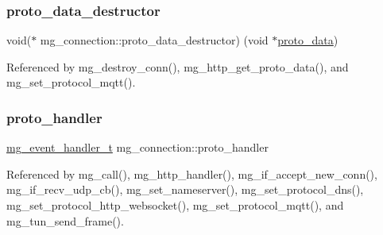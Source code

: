 \mbox{\label{structmg__connection_a834e7757b28379b2ca0b8b6c51d7ba95_a834e7757b28379b2ca0b8b6c51d7ba95}} 
\subsubsection{\texorpdfstring{proto\+\_\+data\+\_\+destructor}{proto\_data\_destructor}}
{\footnotesize\ttfamily void($\ast$ mg\+\_\+connection\+::proto\+\_\+data\+\_\+destructor) (void $\ast$\hyperlink{structmg__connection_a7508851a3c070a1357c226781fa92bb7_a7508851a3c070a1357c226781fa92bb7}{proto\+\_\+data})}



Referenced by mg\+\_\+destroy\+\_\+conn(), mg\+\_\+http\+\_\+get\+\_\+proto\+\_\+data(), and mg\+\_\+set\+\_\+protocol\+\_\+mqtt().

\mbox{\label{structmg__connection_ae6b1f0d002253c0f80371fc5a7bbfc70_ae6b1f0d002253c0f80371fc5a7bbfc70}} 
\subsubsection{\texorpdfstring{proto\+\_\+handler}{proto\_handler}}
{\footnotesize\ttfamily \hyperlink{mongoose_8h_ae5a76da37b3496fcdf561e51648eabda_ae5a76da37b3496fcdf561e51648eabda}{mg\+\_\+event\+\_\+handler\+\_\+t} mg\+\_\+connection\+::proto\+\_\+handler}



Referenced by mg\+\_\+call(), mg\+\_\+http\+\_\+handler(), mg\+\_\+if\+\_\+accept\+\_\+new\+\_\+conn(), mg\+\_\+if\+\_\+recv\+\_\+udp\+\_\+cb(), mg\+\_\+set\+\_\+nameserver(), mg\+\_\+set\+\_\+protocol\+\_\+dns(), mg\+\_\+set\+\_\+protocol\+\_\+http\+\_\+websocket(), mg\+\_\+set\+\_\+protocol\+\_\+mqtt(), and mg\+\_\+tun\+\_\+send\+\_\+frame().

\mbox{\label{structmg__connection_a72adb9aba4bbe59a9bd591de496713b3_a72adb9aba4bbe59a9bd591de496713b3}} 
